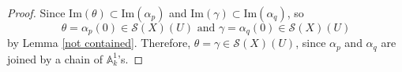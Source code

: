 \documentclass[11pt, reqno]{amsart}
\theoremstyle{plain}
\newtheorem{theorem}[thm]{Theorem}
\newtheorem{lemma}[thm]{Lemma}
\newtheorem{proposition}[thm]{Proposition}
\theoremstyle{definition}
\newtheorem{remark}[thm]{Remark}
\newcommand{\Spec}{{\rm Spec \,}}
\begin{document}
\begin{proof}
Since $\text{Im}(\theta) \subset \text{Im}(\alpha_p) $ and $\text{Im}(\gamma) \subset \text{Im}(\alpha_q)$, so 
$$\theta = \alpha_p(0) \in \mathcal{S}(X)(U) \text{ and } \gamma = \alpha_q(0) \in \mathcal{S}(X)(U)$$
by Lemma \ref{not contained}. Therefore, $\theta =  \gamma \in \mathcal{S}(X)(U)$, since $\alpha_p$ and $\alpha_q$ are joined by a chain of $\mathbb{A}^1_k$'s.
\end{proof}
\end{document}
